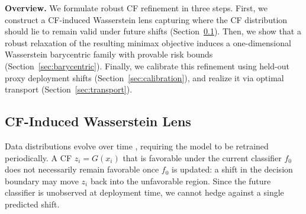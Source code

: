 



\textbf{Overview.}
We formulate robust CF refinement in three steps. First, we construct a CF-induced Wasserstein lens capturing where the CF distribution should lie to remain valid under future shifts (Section~\ref{sec:lens}). Then, we show that a robust relaxation of the resulting minimax objective induces a one-dimensional Wasserstein barycentric family with provable risk bounds (Section~\ref{sec:barycentric}). Finally, we calibrate this refinement using held-out proxy deployment shifts (Section~\ref{sec:calibration}), and realize it via optimal transport (Section~\ref{sec:transport}).


\subsection{CF-Induced Wasserstein Lens}\label{sec:lens}

Data distributions evolve over time \citep{quionero2009dataset}, requiring the model to be retrained periodically. 
A CF $z_i = G(x_i)$ that is favorable under the current classifier $f_0$ does not necessarily remain favorable once $f_0$ is updated: a shift in the decision boundary may move $z_i$ back into the unfavorable region. 
Since the future classifier is unobserved at deployment time, we cannot hedge against a single predicted shift. 

